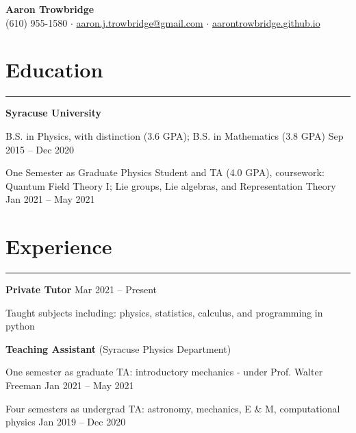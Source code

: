 \documentclass[9pt]{extarticle}
\newcommand{\myline}{\rule[\baselineskip]{\linewidth}{1pt}}
\begin{document}
\begin{center}
\Huge
\textbf{Aaron Trowbridge}\\

\normalsize
(610) 955-1580 $\cdot$ \href{mailto:aaron.j.trowbridge@gmail.com}{aaron.j.trowbridge@gmail.com} $\cdot$ \href{https://aarontrowbridge.github.io/}{aarontrowbridge.github.io} \\

\end{center}


\section{Education}

\myline


\large\textbf{Syracuse University} 

\normalsize
\begin{compactitem}
\setlength\itemsep{0em}
\item B.S. in Physics, with distinction (3.6 GPA); B.S. in Mathematics (3.8 GPA) \hfill \small Sep 2015 -- Dec 2020 
\item One Semester as Graduate Physics Student and TA (4.0 GPA), coursework: \\ Quantum Field Theory I; Lie groups, Lie algebras, and Representation Theory \hfill \small Jan 2021 -- May 2021
\end{compactitem}


\section{Experience}

\myline

\large\textbf{Private Tutor} \hfill \small Mar 2021 -- Present
\normalsize

\begin{compactitem}
\item Taught subjects including: physics, statistics, calculus, and programming in python
\end{compactitem}

\vspace{2.5pt}
\large\textbf{Teaching Assistant} \normalsize (Syracuse Physics Department)
\normalsize

\begin{compactitem}
\item One semester as graduate TA: introductory mechanics - under Prof. Walter Freeman \hfill \small Jan 2021 -- May 2021
\item Four semesters as undergrad TA: astronomy, mechanics, E $\&$ M, computational physics  \hfill \small Jan 2019 -- Dec 2020
\end{compactitem}
\end{document}
